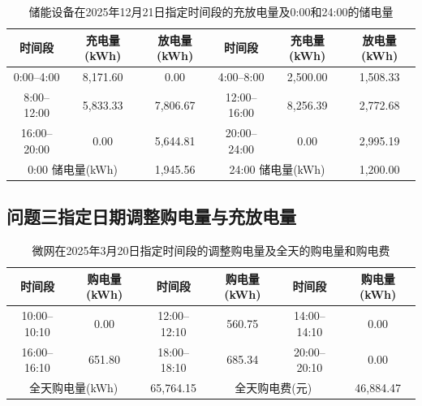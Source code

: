 \begin{table}[H]
  \centering
  \caption{储能设备在2025年12月21日指定时间段的充放电量及0:00和24:00的储电量}
  \label{tab:q2-storage-1221}
  \small
  \renewcommand{\arraystretch}{1.3}
  \begin{tabular}{|c|c|c|c|c|c|}
    \hline
    时间段 & 充电量(kWh) & 放电量(kWh)
    & 时间段 & 充电量(kWh) & 放电量(kWh) \\
    \hline
    0:00--4:00 & 8{,}171.60 & 0.00
    & 4:00--8:00 & 2{,}500.00 & 1{,}508.33 \\
    \hline
    8:00--12:00 & 5{,}833.33 & 7{,}806.67
    & 12:00--16:00 & 8{,}256.39 & 2{,}772.68 \\
    \hline
    16:00--20:00 & 0.00 & 5{,}644.81
    & 20:00--24:00 & 0.00 & 2{,}995.19 \\
    \hline
    \multicolumn{2}{|c|}{0:00 储电量(kWh)}
    & \multicolumn{1}{c|}{1{,}945.56}
    & \multicolumn{2}{c|}{24:00 储电量(kWh)}
    & \multicolumn{1}{c|}{1{,}200.00} \\
    \hline
  \end{tabular}
\end{table}

\subsection*{问题三指定日期调整购电量与充放电量}

\begin{table}[H]
  \centering
  \caption{微网在2025年3月20日指定时间段的调整购电量及全天的购电量和购电费}
  \label{tab:q3-adj-0320}
  \small
  \renewcommand{\arraystretch}{1.3}
  \begin{tabular}{|c|c|c|c|c|c|}
    \hline
    时间段 & 购电量(kWh) & 时间段 & 购电量(kWh) & 时间段 & 购电量(kWh) \\
    \hline
    10:00--10:10 & 0.00 & 12:00--12:10 & 560.75 & 14:00--14:10 & 0.00 \\
    \hline
    16:00--16:10 & 651.80 & 18:00--18:10 & 685.34 & 20:00--20:10 & 0.00 \\
    \hline
    \multicolumn{2}{|c|}{全天购电量(kWh)} & \multicolumn{1}{c|}{65{,}764.15} & \multicolumn{2}{c|}{全天购电费(元)} & \multicolumn{1}{c|}{46{,}884.47} \\
    \hline
  \end{tabular}
\end{table}

